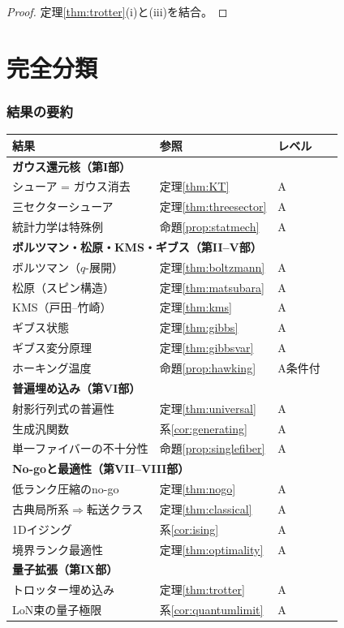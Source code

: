 \documentclass[12pt]{article}
\theoremstyle{plain}
\theoremstyle{definition}
\numberwithin{equation}{section}
\begin{document}
\begin{proof}
定理\ref{thm:trotter}(i)と(iii)を結合。
\end{proof}


\part{完全分類}

\section{結果の要約}\label{sec:summary}

\begin{center}
\begin{tabular}{p{5.0cm}lll}
\toprule
結果 & 参照 & レベル\\
\midrule
\multicolumn{3}{l}{\textbf{ガウス還元核（第I部）}}\\
\quad シューア = ガウス消去 & 定理\ref{thm:KT} & A\\
\quad 三セクターシューア & 定理\ref{thm:threesector} & A\\
\quad 統計力学は特殊例 & 命題\ref{prop:statmech} & A\\
\midrule
\multicolumn{3}{l}{\textbf{ボルツマン・松原・KMS・ギブス（第II--V部）}}\\
\quad ボルツマン（$q$-展開） & 定理\ref{thm:boltzmann} & A\\
\quad 松原（スピン構造） & 定理\ref{thm:matsubara} & A\\
\quad KMS（戸田--竹崎） & 定理\ref{thm:kms} & A\\
\quad ギブス状態 & 定理\ref{thm:gibbs} & A\\
\quad ギブス変分原理 & 定理\ref{thm:gibbsvar} & A\\
\quad ホーキング温度 & 命題\ref{prop:hawking} & A条件付\\
\midrule
\multicolumn{3}{l}{\textbf{普遍埋め込み（第VI部）}}\\
\quad 射影行列式の普遍性 & 定理\ref{thm:universal} & A\\
\quad 生成汎関数 & 系\ref{cor:generating} & A\\
\quad 単一ファイバーの不十分性 & 命題\ref{prop:singlefiber} & A\\
\midrule
\multicolumn{3}{l}{\textbf{No-goと最適性（第VII--VIII部）}}\\
\quad 低ランク圧縮のno-go & 定理\ref{thm:nogo} & A\\
\quad 古典局所系$\Rightarrow$転送クラス & 定理\ref{thm:classical} & A\\
\quad 1Dイジング & 系\ref{cor:ising} & A\\
\quad 境界ランク最適性 & 定理\ref{thm:optimality} & A\\
\midrule
\multicolumn{3}{l}{\textbf{量子拡張（第IX部）}}\\
\quad トロッター埋め込み & 定理\ref{thm:trotter} & A\\
\quad LoN束の量子極限 & 系\ref{cor:quantumlimit} & A\\
\bottomrule
\end{tabular}
\end{center}
\end{document}
